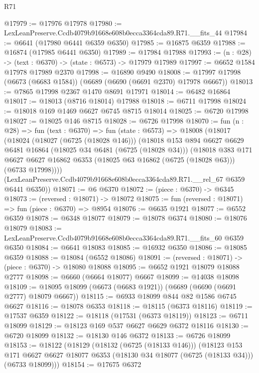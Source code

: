 \begin{lexlean}{R71}
\begin{coremodule}
@17979 := @17976 @17978
@17980 := LexLeanPreserve.Ccdb4079b91668e608b0ecca3364cda89.R71.__fits_44
@17984 := @6641 (@17980 @6441 @6359 @6350)
@17985 := @16875 @6359
@17988 := @16874 (@17985 @6441 @6350)
@17989 := @17984 @17988
@17993 := (n : @28) -> (text : @6370) -> (state : @6573) -> @17979 @17989
@17997 := @6652 @1584 @17978 @17989 @2370
@17998 := @16890 @9490
@18008 := @17997 @17998 (@6673 (@6683 @1584)) (@6689 (@6690 (@6691 @2370) @17978 @6667))
@18013 := @7865 @17998 @2367 @1470 @8691 @17971
@18014 := @6482 @16864
@18017 := @18013 (@8716 @18014) @17988
@18018 := @6711 @17998
@18024 := @18018 @169 @1469 @6627 @6745 @8715 @18014
@18025 := @6720 @17998
@18027 := @18025 @146 @8715
@18028 := @6726 @17998
@18070 := fun (n : @28) =>
  fun (text : @6370) =>
  fun (state : @6573) =>
  @18008
    (@18017
      (@18024
        (@18027 (@6725 (@18028 @146)))
        (@18018
          @153
          @894
          @6627
          @6629
          @6481
          @16864
          (@18025 @34 @6481 (@6725 (@18028 @34)))
          (@18018
            @383
            @171
            @6627
            @6627
            @16862
            @6353
            (@18025 @63 @16862 (@6725 (@18028 @63)))
            (@6733 @17998))))
      (LexLeanPreserve.Ccdb4079b91668e608b0ecca3364cda89.R71.__rel_67 @6359 @6441 @6350))
@18071 := @6 @6370
@18072 := (piece : @6370) -> @6345
@18073 := (reversed : @18071) -> @18072
@18075 := fun (reversed : @18071) => fun (piece : @6370) => @8954
@18076 := @6635 @1921
@18077 := @6552 @6359
@18078 := @6348 @18077
@18079 := @18078 @6374
@18080 := @18076 @18079
@18083 := LexLeanPreserve.Ccdb4079b91668e608b0ecca3364cda89.R71.__fits_60 @6359 @6350
@18084 := @6641 @18083
@18085 := @16932 @6350
@18086 := @18085 @6359
@18088 := @18084 (@6552 @18086)
@18091 := (reversed : @18071) -> (piece : @6370) -> @18080 @18088
@18095 := @6652 @1921 @18079 @18088 @2777
@18098 := @6660 (@6664 @18077) @6667
@18099 := @14038 @18098
@18109 := @18095 @18099 (@6673 (@6683 @1921)) (@6689 (@6690 (@6691 @2777) @18079 @6667))
@18115 := @6933 @18099 @844 @82 @1586 @6745 @6627
@18116 := @18078 @6353
@18118 := @18115 (@6373 @18116)
@18119 := @17537 @6359
@18122 := @18118 (@17531 (@6373 @18119))
@18123 := @6711 @18099
@18129 := @18123 @169 @537 @6627 @6629 @6372 @18116
@18130 := @6720 @18099
@18132 := @18130 @146 @6372
@18133 := @6726 @18099
@18153 := @18122
    (@18129
      (@18132 (@6725 (@18133 @146)))
      (@18123
        @153
        @171
        @6627
        @6627
        @18077
        @6353
        (@18130 @34 @18077 (@6725 (@18133 @34)))
        (@6733 @18099)))
@18154 := @17675 @6372

\end{coremodule}
\end{lexlean}
